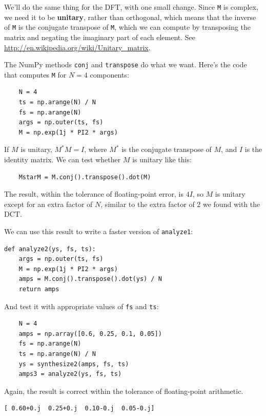 \documentclass[12pt]{book}
\begin{document}
We'll do the same thing for the DFT, with one small change.
Since {\tt M} is complex, we need it to be {\bf unitary}, rather
than orthogonal, which means that the inverse of {\tt M} is
the conjugate transpose of {\tt M}, which we can compute by
transposing the matrix and negating the imaginary part of each
element.  See \url{http://en.wikipedia.org/wiki/Unitary_matrix}.

The NumPy methods {\tt conj} and {\tt transpose} do what we
want.  Here's the code that computes {\tt M} for $N=4$ components:

\begin{verbatim}
    N = 4
    ts = np.arange(N) / N
    fs = np.arange(N)
    args = np.outer(ts, fs)
    M = np.exp(1j * PI2 * args)
\end{verbatim}

If $M$ is unitary, $M^*M = I$, where $M^*$ is the conjugate transpose
of $M$, and $I$ is the identity matrix.  We can test whether $M$
is unitary like this:

\begin{verbatim}
    MstarM = M.conj().transpose().dot(M)
\end{verbatim}

The result, within the tolerance of floating-point error, is
$4 I$, so $M$ is unitary except for an extra factor of $N$,
similar to the extra factor of 2 we found with the DCT.

We can use this result to write a faster version of {\tt analyze1}:

\begin{verbatim}
def analyze2(ys, fs, ts):
    args = np.outer(ts, fs)
    M = np.exp(1j * PI2 * args)
    amps = M.conj().transpose().dot(ys) / N
    return amps
\end{verbatim}

And test it with appropriate values of {\tt fs} and {\tt ts}:

\begin{verbatim}
    N = 4
    amps = np.array([0.6, 0.25, 0.1, 0.05])
    fs = np.arange(N)
    ts = np.arange(N) / N
    ys = synthesize2(amps, fs, ts)
    amps3 = analyze2(ys, fs, ts)
\end{verbatim}

Again, the result is correct within the tolerance of floating-point
arithmetic.

\begin{verbatim}
[ 0.60+0.j  0.25+0.j  0.10-0.j  0.05-0.j]
\end{verbatim}
\end{document}
